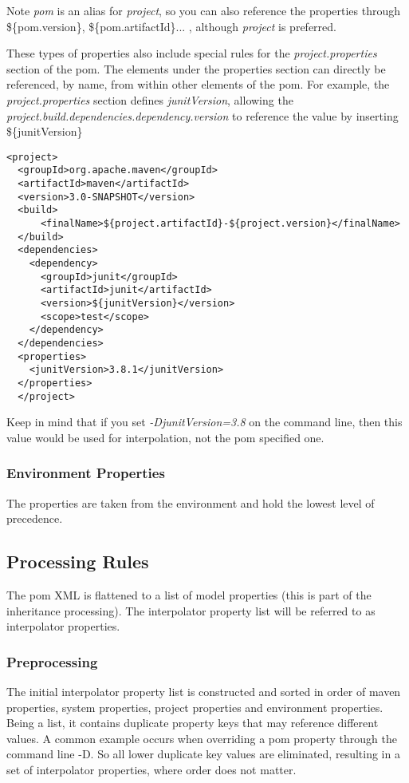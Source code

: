 \documentclass[12pt]{amsart}
\begin{document}
Note \emph{pom} is an alias for\emph{ project}, so you can also reference the properties through \$\{pom.version\}, \$\{pom.artifactId\}... , although \emph{project} is preferred.

These types of properties also include special rules for the \emph{project.properties }section of the pom. The elements under the properties section can directly be referenced, by name, from within other elements of the pom. For example, the \emph{project.properties }section defines \emph{junitVersion}, allowing the 
\emph{ project.build.dependencies.dependency.version} to reference the value by inserting \$\{junitVersion\}

\begin{verbatim}
<project>
  <groupId>org.apache.maven</groupId>
  <artifactId>maven</artifactId>
  <version>3.0-SNAPSHOT</version>
  <build>
      <finalName>${project.artifactId}-${project.version}</finalName>
  </build>
  <dependencies>
    <dependency>
      <groupId>junit</groupId>
      <artifactId>junit</artifactId>
      <version>${junitVersion}</version>
      <scope>test</scope>
    </dependency>
  </dependencies>
  <properties>
    <junitVersion>3.8.1</junitVersion>
  </properties>
  </project>
\end{verbatim}

Keep in mind that if you set  \emph{-DjunitVersion=3.8} on the command line, then this value would be used for interpolation, not the pom specified one.

\subsubsection{Environment Properties}
The properties are taken from the environment and hold the lowest level of precedence.

\subsection{Processing Rules}
The pom XML is flattened to a list of model properties (this is part of the inheritance processing). The interpolator property list will be referred to as interpolator properties.
 
\subsubsection{Preprocessing}
The initial interpolator property list is constructed and sorted in order of maven properties, system properties, project properties and environment properties. Being a list, it contains duplicate property keys that may reference different values. A common example occurs when overriding a pom property through the command line -D. So all lower duplicate key values are eliminated, resulting in a set of interpolator properties, where order does not matter.
\end{document}
